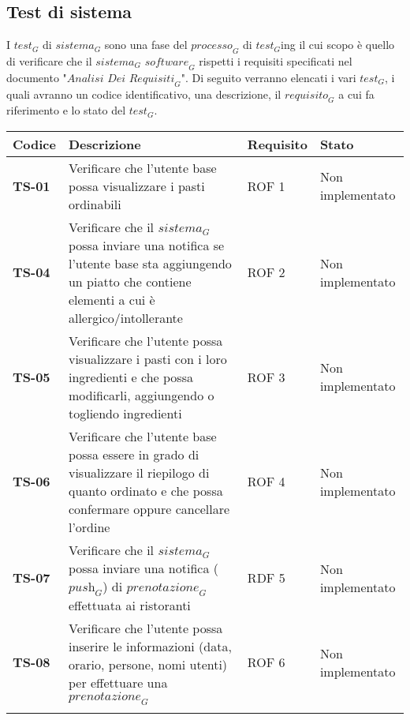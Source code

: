 \subsection{Test di sistema}
I $\textit{test}_G$ di $\textit{sistema}_G$ sono una fase del $\textit{processo}_G$ di $\textit{test}_G$ing il cui scopo è quello di verificare che il $\textit{sistema}_G$ $\textit{software}_G$ rispetti i requisiti specificati nel documento "$\textit{Analisi Dei Requisiti}_G$".
Di seguito verranno elencati i vari $\textit{test}_G$, i quali avranno un codice identificativo, una descrizione, il $\textit{requisito}_G$ a cui fa riferimento e lo stato del $\textit{test}_G$.
    \begin{longtable}{|>{\centering\arraybackslash}p{1.5cm}|p{9.8cm}|p{2cm}|p{3.5cm}|}
    \hline
    \rowcolor{gray!30}
    \textbf{Codice} & \textbf{Descrizione} & \textbf{Requisito} & \textbf{Stato} \\
    \hline
    \rowcolor{gray!10}
    \textbf{TS-01} & Verificare che l'utente base possa visualizzare i pasti ordinabili & ROF 1 & Non implementato \\
    \hline
    \rowcolor{gray!10}
    \textbf{TS-04} & Verificare che il $\textit{sistema}_G$ possa inviare una notifica se l'utente base sta aggiungendo un piatto che contiene elementi a cui è allergico/intollerante & ROF 2 & Non implementato \\ 
    \hline 
    \rowcolor{gray!10}
    \textbf{TS-05} & Verificare che l'utente possa visualizzare i pasti con i loro ingredienti e che possa modificarli, aggiungendo o togliendo ingredienti & ROF 3 & Non implementato \\ 
    \hline
    \rowcolor{gray!10}
    \textbf{TS-06} & Verificare che l'utente base possa essere in grado di visualizzare il riepilogo di quanto ordinato e che possa confermare oppure cancellare l'ordine & ROF 4 & Non implementato \\ 
    \hline
    \rowcolor{gray!10}
    \textbf{TS-07} & Verificare che il $\textit{sistema}_G$ possa inviare una notifica ($\textit{push}_G$) di $\textit{prenotazione}_G$ effettuata ai ristoranti & RDF 5 & Non implementato \\ 
    \hline
    \rowcolor{gray!10}
    \textbf{TS-08} & Verificare che l'utente possa inserire le informazioni (data, orario, persone, nomi utenti) per effettuare una $\textit{prenotazione}_G$ & ROF 6 & Non implementato \\
    \hline
    \rowcolor{gray!10}

\end{longtable}
